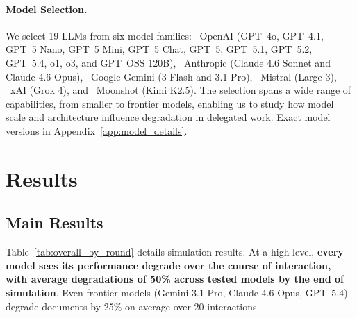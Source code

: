 \documentclass{article} %
\begin{document}
\paragraph{Model Selection.} \label{sec:model_selection}
We select 19 LLMs from six model families: \openai~OpenAI (GPT~4o, GPT~4.1, GPT~5 Nano, GPT~5 Mini, GPT~5 Chat, GPT~5, GPT~5.1, GPT~5.2, GPT~5.4, o1, o3, and GPT~OSS 120B), \claude~Anthropic (Claude 4.6 Sonnet and Claude 4.6 Opus), \gemini~Google Gemini (3 Flash and 3.1 Pro), \mistral~Mistral (Large 3), \xai~xAI (Grok 4), and \moonshot~Moonshot (Kimi K2.5). The selection spans a wide range of capabilities, from smaller to frontier models, enabling us to study how model scale and architecture influence degradation in delegated work. Exact model versions in Appendix~\ref{app:model_details}.

\section{Results} \label{sec:results}

\subsection{Main Results} \label{sec:main_results}

\begin{table}
    \vspace{-7\intextsep}
    
    \caption[Round-trip relay results for 19 LLMs on \benchmark{}.]{Round-trip relay results for 19 LLMs on \benchmark{} (20 interactions). All models accumulate errors, leading to significant document corruption. Background color: degradation from the seed document.\protect\footnotemark}
    \label{tab:overall_by_round}
    \vspace{-1\intextsep}
\end{table}

Table~\ref{tab:overall_by_round} details simulation results. At a high level, \textbf{every model sees its performance degrade over the course of interaction, with average degradations of 50\% across tested models by the end of simulation}. Even frontier models (Gemini 3.1 Pro, Claude 4.6 Opus, GPT~5.4) degrade documents by 25\% on average over 20 interactions.
\end{document}
